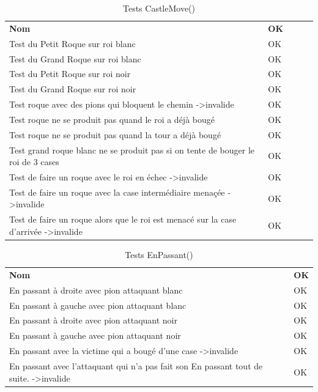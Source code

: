 \documentclass[12pt]{article}
\begin{document}
\begin{table}[h!]
\caption{Tests CastleMove()}
\begin{tabular}{lllll}
\textbf{Nom}                                                                           & \textbf{OK} \\
Test du Petit Roque sur roi blanc                                                               & OK \\
Test du Grand Roque sur roi blanc                                                               & OK \\
Test du Petit Roque sur roi noir                                                                & OK \\
Test du Grand Roque sur roi noir                                                                & OK \\
Test roque avec des pions qui bloquent le chemin -\textgreater invalide                         & OK \\
Test roque ne se produit pas quand le roi a déjà bougé                                          & OK \\
Test roque ne se produit pas quand la tour a déjà bougé                                         & OK \\
Test grand roque blanc ne se produit pas si on tente de bouger le roi de 3 cases                & OK \\
Test de faire un roque avec le roi en échec -\textgreater invalide                              & OK \\
Test de faire un roque avec la case intermédiaire menaçée -\textgreater invalide                & OK \\
Test de faire un roque alors que le roi est menacé sur la case d'arrivée -\textgreater invalide & OK
\end{tabular}
\end{table}

\begin{table}[]
\caption{Tests EnPassant()}
\begin{tabular}{ll}
\textbf{Nom}                                                                                      & \textbf{OK }\\
En passant à droite avec pion attaquant blanc                                                     & OK \\
En passant à gauche avec pion attaquant blanc                                                     & OK \\
En passant à droite avec pion attaquant noir                                                      & OK \\
En passant à gauche avec pion attaquant noir                                                      & OK \\
En passant avec la victime qui a bougé d'une case -\textgreater invalide                          & OK \\
En passant avec l'attaquant qui n'a pas fait son En passant tout de suite. -\textgreater invalide & OK
\end{tabular}
\end{table}
\end{document}
